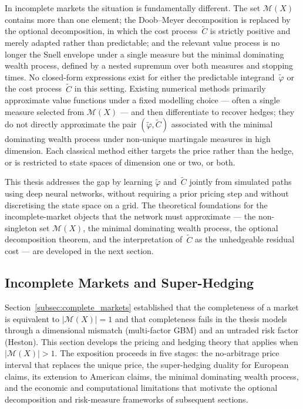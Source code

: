 In incomplete markets the situation is fundamentally different.  The set
$\mathcal{M}(X)$ contains more than one element; the Doob--Meyer
decomposition is replaced by the optional decomposition, in which the
cost process~$\tilde{C}$ is strictly positive and merely adapted rather
than predictable; and the relevant value process is no longer the Snell
envelope under a single measure but the minimal dominating wealth process,
defined by a nested supremum over both measures and stopping times.  No
closed-form expressions exist for either the predictable
integrand~$\tilde{\varphi}$ or the cost process~$\tilde{C}$ in this
setting.  Existing numerical methods primarily approximate value functions
under a fixed modelling choice --- often a single measure selected from
$\mathcal{M}(X)$ --- and then differentiate to recover hedges; they do
not directly approximate the pair
$(\tilde{\varphi}, \tilde{C})$ associated with the minimal dominating
wealth process under non-unique martingale measures in high dimension.
Each classical method either targets the price rather than the hedge, or
is restricted to state spaces of dimension one or two, or both.

This thesis addresses the gap by learning $\tilde{\varphi}$
and~$\tilde{C}$ jointly from simulated paths using deep neural networks,
without requiring a prior pricing step and without discretising the state
space on a grid.  The theoretical foundations for the incomplete-market
objects that the network must approximate --- the non-singleton set
$\mathcal{M}(X)$, the minimal dominating wealth process, the optional
decomposition theorem, and the interpretation of~$\tilde{C}$ as the
unhedgeable residual cost --- are developed in the next section.

\subsection{Incomplete Markets and Super-Hedging}
\label{subsec:incomplete_markets}

Section~\ref{subsec:complete_markets} established that the completeness of
a market is equivalent to $|\mathcal{M}(X)| = 1$ and that completeness
fails in the thesis models through a dimensional mismatch (multi-factor
GBM) and an untraded risk factor (Heston).  This section develops the
pricing and hedging theory that applies when $|\mathcal{M}(X)| > 1$.
The exposition proceeds in five stages: the no-arbitrage price interval
that replaces the unique price, the super-hedging duality for European
claims, its extension to American claims, the minimal dominating wealth
process, and the economic and computational limitations that motivate the
optional decomposition and risk-measure frameworks of subsequent sections.


